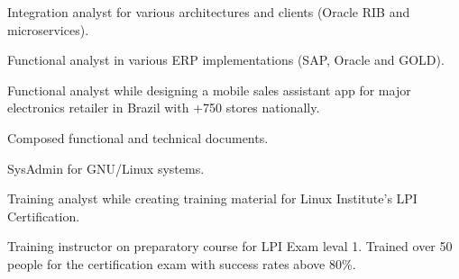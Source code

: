 \documentclass[a4paper]{deedy-resume} %
\begin{document}
\begin{minipage}[t]{0.66\textwidth}
\begin{tightitemize}
\item Integration analyst for various architectures and clients (Oracle RIB and microservices).
\item Functional analyst in various ERP implementations (SAP, Oracle and GOLD).
\item Functional analyst while designing a mobile sales assistant app for major electronics retailer in Brazil with +750 stores nationally.
\item Composed functional and technical documents.
\end{tightitemize}

\sectionspace %



\begin{tightitemize}
\item SysAdmin for GNU/Linux systems.
\item Training analyst while creating training material for  Linux Institute's LPI Certification.
\item Training instructor on preparatory course for LPI Exam leval 1. Trained over 50 people for the certification exam with success rates above 80\%.
\end{tightitemize}

\sectionspace %







\end{minipage}
\end{document}
